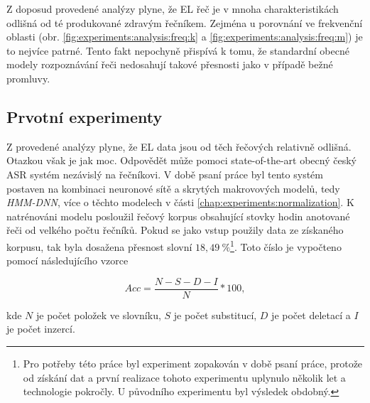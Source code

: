 Z doposud provedené analýzy plyne, že EL řeč je v mnoha charakteristikách odlišná od té produkované zdravým řečníkem. Zejména u porovnání ve frekvenční oblasti (obr. \ref{fig:experiments:analysis:freq:k} a \ref{fig:experiments:analysis:freq:m}) je to nejvíce patrné. Tento fakt nepochyně přispívá k tomu, že standardní obecné modely rozpoznávání řeči nedosahují takové přesnosti jako v případě bežné promluvy.


\subsection{Prvotní experimenty}
\label{chap:experiments:analysis:experiment}

Z provedené analýzy plyne, že EL data jsou od těch  řečových relativně odlišná. Otazkou však je jak moc. Odpovědět může pomoci state-of-the-art obecný český ASR systém nezávislý na řečníkovi. V době psaní práce byl tento systém postaven na kombinaci neuronové sítě a skrytých makrovových modelů, tedy \textit{HMM-DNN}, více o těchto modelech v části \ref{chap:experiments:normalization}. K natrénováni modelu posloužil řečový korpus obsahující stovky hodin anotované řeči od velkého počtu řečníků. Pokud se jako vstup použily data ze získaného korpusu, tak byla dosažena přesnost slovní $18,49\ \%$\footnote{Pro potřeby této práce byl experiment zopakován v době psaní práce, protože od získání dat a první realizace tohoto experimentu uplynulo několik let a technologie pokročly. U původního experimentu byl výsledek obdobný.}. Toto číslo je vypočteno pomocí následujícího vzorce

\begin{equation}
  Acc = \frac{N - S - D - I}{N} * 100
  \label{eq:experiments:analysis:experiment:accuracy},
\end{equation}

\noindent kde $N$ je počet položek ve slovníku, $S$ je počet substitucí, $D$ je počet deletací a $I$ je počet inzercí.

